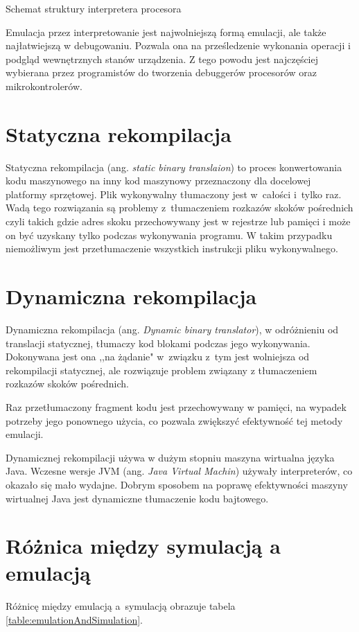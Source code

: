 	\begin{listing}[h]
		\inputminted{java}{listings/interpreter.c}
		\caption{Schemat struktury interpretera procesora}
		\label{listing:interpreter}
	\end{listing}
		
	Emulacja przez interpretowanie jest najwolniejszą formą emulacji, ale także najłatwiejszą w debugowaniu. Pozwala ona na prześledzenie wykonania operacji i podgląd wewnętrznych stanów urządzenia. Z tego powodu jest najczęściej wybierana przez programistów do tworzenia debuggerów procesorów oraz mikrokontrolerów.
	
	\section{Statyczna rekompilacja}
	Statyczna rekompilacja (ang. \emph{static binary translaion}) to proces konwertowania kodu maszynowego na inny kod maszynowy przeznaczony dla docelowej platformy sprzętowej. Plik wykonywalny tłumaczony jest w~całości i~tylko raz. Wadą tego rozwiązania są problemy z~tłumaczeniem rozkazów skoków pośrednich czyli takich gdzie adres skoku przechowywany jest w rejestrze lub pamięci i może on być uzyskany tylko podczas wykonywania programu. W takim przypadku niemożliwym jest przetłumaczenie wszystkich instrukcji pliku wykonywalnego\cite{uqbt}. 
	
	
	\section{Dynamiczna rekompilacja}
	Dynamiczna rekompilacja (ang. \emph{Dynamic binary translator}), w odróżnieniu od translacji statycznej, tłumaczy kod blokami podczas jego wykonywania. Dokonywana jest ona ,,na żądanie" w~związku z~tym jest wolniejsza od rekompilacji statycznej, ale rozwiązuje problem związany z tłumaczeniem rozkazów skoków pośrednich.
	
	Raz przetłumaczony fragment kodu jest przechowywany w pamięci, na wypadek potrzeby jego ponownego użycia, co pozwala zwiększyć efektywność tej metody emulacji\cite{uqbt}.
	
	Dynamicznej rekompilacji używa w dużym stopniu maszyna wirtualna języka Java. Wczesne wersje JVM (ang. \emph{Java Virtual Machin}) używały interpreterów, co okazało się mało wydajne. Dobrym sposobem na poprawę efektywności maszyny wirtualnej Java jest dynamiczne tłumaczenie kodu bajtowego\cite{dynamicRecompilationInJava}. 
	
	\section{Różnica między symulacją a emulacją} 
	Różnicę między emulacją a~symulacją obrazuje tabela \ref{table:emulationAndSimulation}.
	
